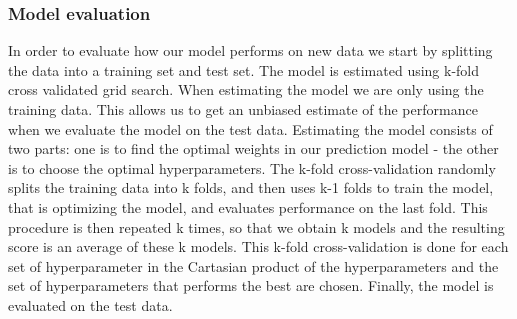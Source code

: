 \subsubsection{Model evaluation}
In order to evaluate how our model performs on new data we start by splitting the data into a training set and test set. 
The model is estimated using k-fold cross validated grid search. When estimating the model we are only using the training data. This allows us to get an unbiased estimate of the performance when we evaluate the model on  the test data.
Estimating the model consists of two parts: one is to find the optimal weights in our prediction model - the other is to choose the optimal hyperparameters. The k-fold cross-validation randomly splits the training data into k folds, and then uses k-1 folds to train the model, that is optimizing the model, and evaluates performance on the last fold. This procedure is then repeated k times, so that we obtain k models and the resulting score is an average of these k models. This k-fold cross-validation is done for each set of hyperparameter in the Cartasian product of the hyperparameters and the set of hyperparameters that performs the best are chosen. Finally, the model is evaluated on the test data.




